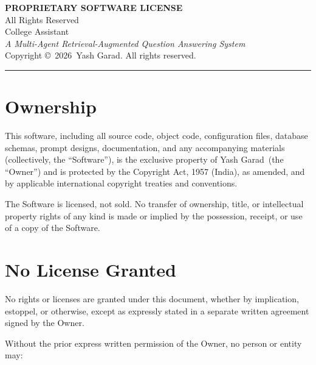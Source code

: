\documentclass[11pt,a4paper]{article}
\newcommand{\OwnerName}{Yash Garad}
\newcommand{\SoftwareName}{College Assistant}
\newcommand{\SoftwareTagline}{A Multi-Agent Retrieval-Augmented Question Answering System}
\newcommand{\CopyrightYear}{2026}
\begin{document}
\begin{center}
    {\LARGE \bfseries PROPRIETARY SOFTWARE LICENSE}\\[0.3em]
    {\large All Rights Reserved}\\[1.2em]
    {\Large \SoftwareName}\\[0.2em]
    {\normalsize \itshape \SoftwareTagline}\\[0.8em]
    Copyright \copyright\ \CopyrightYear\ \OwnerName. All rights reserved.
\end{center}

\vspace{1em}
\noindent\rule{\linewidth}{0.6pt}
\vspace{0.5em}

\section{Ownership}

This software, including all source code, object code, configuration files,
database schemas, prompt designs, documentation, and any accompanying
materials (collectively, the ``Software''), is the exclusive property of
\OwnerName\ (the ``Owner'') and is protected by the Copyright Act, 1957
(India), as amended, and by applicable international copyright treaties and
conventions.

The Software is licensed, not sold. No transfer of ownership, title, or
intellectual property rights of any kind is made or implied by the
possession, receipt, or use of a copy of the Software.

\section{No License Granted}

No rights or licenses are granted under this document, whether by
implication, estoppel, or otherwise, except as expressly stated in a
separate written agreement signed by the Owner.

Without the prior express written permission of the Owner, no person or
entity may:
\end{document}
